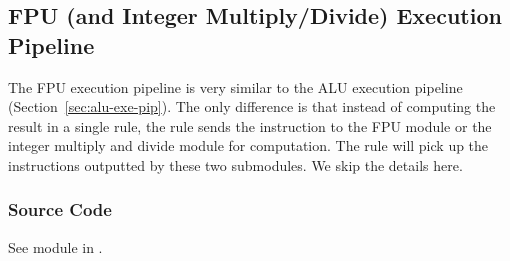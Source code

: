 \subsection{FPU (and Integer Multiply/Divide) Execution Pipeline}

The FPU execution pipeline is very similar to the ALU execution pipeline (Section~\ref{sec:alu-exe-pip}).
The only difference is that instead of computing the result in a single rule, the  rule sends the instruction to the FPU module or the integer multiply and divide module for computation.
The  rule will pick up the instructions outputted by these two submodules.
We skip the details here.

\subsubsection{Source Code}
See module  in .

